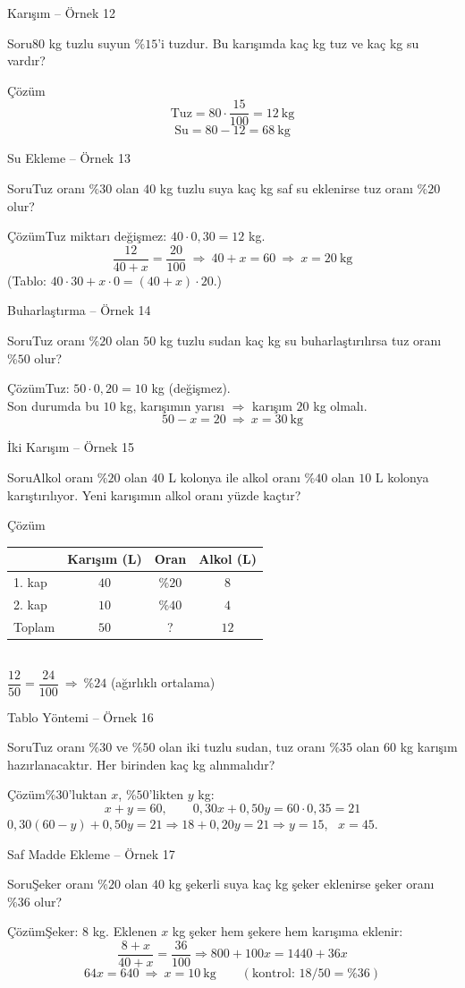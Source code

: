 \documentclass[aspectratio=169,11pt]{beamer}
\newcommand{\soru}[3]{%
\begin{frame}{#1}
  \begin{block}{Soru}\large #2\end{block}
  \pause
  \begin{exampleblock}{Çözüm}\large #3\end{exampleblock}
\end{frame}}
\begin{document}
\soru{Karışım -- Örnek 12}
{\(80\) kg tuzlu suyun \(\%15\)'i tuzdur. Bu karışımda kaç kg tuz ve kaç kg su vardır?}
{\[\text{Tuz}=80\cdot\frac{15}{100}=12\ \text{kg}\]
\[\text{Su}=80-12=68\ \text{kg}\]}

\soru{Su Ekleme -- Örnek 13}
{Tuz oranı \(\%30\) olan \(40\) kg tuzlu suya kaç kg saf su eklenirse tuz oranı \(\%20\) olur?}
{Tuz miktarı değişmez: \(40\cdot 0{,}30=12\) kg.
\[\frac{12}{40+x}=\frac{20}{100}\ \Rightarrow\ 40+x=60\ \Rightarrow\ x=20\ \text{kg}\]
(Tablo: \(40\cdot 30+x\cdot 0=(40+x)\cdot 20\).)}

\soru{Buharlaştırma -- Örnek 14}
{Tuz oranı \(\%20\) olan \(50\) kg tuzlu sudan kaç kg su buharlaştırılırsa tuz oranı \(\%50\) olur?}
{Tuz: \(50\cdot 0{,}20=10\) kg (değişmez).\\[3pt]
Son durumda bu \(10\) kg, karışımın yarısı \(\Rightarrow\) karışım \(20\) kg olmalı.
\[50-x=20\ \Rightarrow\ x=30\ \text{kg}\]}

\soru{İki Karışım -- Örnek 15}
{Alkol oranı \(\%20\) olan \(40\) L kolonya ile alkol oranı \(\%40\) olan \(10\) L kolonya karıştırılıyor. Yeni karışımın alkol oranı yüzde kaçtır?}
{\normalsize
\begin{tabular}{lccc}
\toprule
 & Karışım (L) & Oran & Alkol (L)\\\midrule
1. kap & \(40\) & \(\%20\) & \(8\)\\
2. kap & \(10\) & \(\%40\) & \(4\)\\
Toplam & \(50\) & ? & \(12\)\\\bottomrule
\end{tabular}\\[4pt]
\large \(\dfrac{12}{50}=\dfrac{24}{100}\ \Rightarrow\ \%24\) \quad (ağırlıklı ortalama)}

\soru{Tablo Yöntemi -- Örnek 16}
{Tuz oranı \(\%30\) ve \(\%50\) olan iki tuzlu sudan, tuz oranı \(\%35\) olan \(60\) kg karışım hazırlanacaktır. Her birinden kaç kg alınmalıdır?}
{\(\%30\)'luktan \(x\), \(\%50\)'likten \(y\) kg:
\[x+y=60,\qquad 0{,}30x+0{,}50y=60\cdot 0{,}35=21\]
\(0{,}30(60-y)+0{,}50y=21\Rightarrow 18+0{,}20y=21\Rightarrow y=15\), \ \(x=45\).}

\soru{Saf Madde Ekleme -- Örnek 17}
{Şeker oranı \(\%20\) olan \(40\) kg şekerli suya kaç kg şeker eklenirse şeker oranı \(\%36\) olur?}
{Şeker: \(8\) kg. Eklenen \(x\) kg şeker hem şekere hem karışıma eklenir:
\[\frac{8+x}{40+x}=\frac{36}{100}\Rightarrow 800+100x=1440+36x\]
\[64x=640\ \Rightarrow\ x=10\ \text{kg}\qquad(\text{kontrol: } 18/50=\%36)\]}
\end{document}
